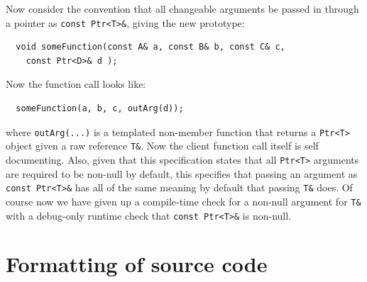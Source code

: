Now consider the convention that all changeable arguments be passed in through
a pointer as {}\texttt{const Ptr<T>\&}, giving the new prototype:

{\small\begin{verbatim}
  void someFunction(const A& a, const B& b, const C& c,
    const Ptr<D>& d );
\end{verbatim}}

Now the function call looks like:

{\small\begin{verbatim}
  someFunction(a, b, c, outArg(d));
\end{verbatim}}

where {}\texttt{outArg(...)} is a templated non-member function that returns a
{}\texttt{Ptr<T>} object given a raw reference {}\texttt{T\&}.  Now the client
function call itself is self documenting.  Also, given that this specification
states that all {}\texttt{Ptr<T>} arguments are required to be non-null by
default, this specifies that passing an argument as {}\texttt{const Ptr<T>\&}
has all of the same meaning by default that passing {}\texttt{T\&} does.  Of
course now we have given up a compile-time check for a non-null argument for
{}\texttt{T\&} with a debug-only runtime check that {}\texttt{const Ptr<T>\&}
is non-null.


%
\section{Formatting of source code}
\label{thyracodingguidelines:formatting:sec}
%

